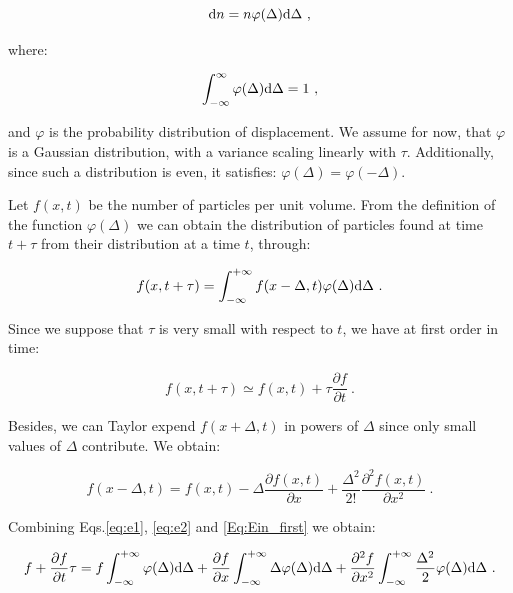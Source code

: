 \begin{equation}
	\textnormal{d}n = n\varphi(\Delta)\textnormal{d}\Delta ~,
\end{equation}

where:

\begin{equation}
	\int_{-\infty} ^{\infty} \varphi (\Delta)\textnormal{d} \Delta = 1 ~,
	\label{Eq:ein_def_phi}
\end{equation}

and $\varphi$ is the probability distribution of displacement. We assume for now, that  $\varphi$ is a Gaussian distribution, with a variance scaling linearly with $\tau$. Additionally, since such a distribution is even, it satisfies: $\varphi (\Delta) = \varphi (-\Delta)$.

Let $f(x,t)$ be the number of particles per unit volume. From the definition of the function $\varphi(\Delta)$ we can obtain the distribution of particles found at time $ t + \tau$ from their distribution at a time $t$, through:

\begin{equation}
	f(x, t+\tau) = \int_{-\infty} ^{ +\infty} f(x-\Delta, t) \varphi (\Delta) \textnormal{d}\Delta ~.
	\label{Eq:Ein_first}
\end{equation}

Since we suppose that $\tau$ is very small with respect to  $t$, we have at first order in time:

\begin{equation}
	f(x, t+\tau) \simeq f(x,t) + \tau \frac{\partial f}{\partial t} ~.
	\label{eq:e1}
\end{equation}

Besides, we can Taylor expend $f(x+\Delta, t)$ in powers of $\Delta$ since only small values of $\Delta$ contribute. We obtain:

\begin{equation}
	f(x - \Delta, t) = f(x,t) - \Delta \frac{\partial f(x,t)}{\partial x} + \frac{\Delta ^2}{2!} \frac{\partial ^2 f(x,t)}{\partial x^2} ~.
	\label{eq:e2}
\end{equation}

Combining Eqs.\ref{eq:e1}, \ref{eq:e2} and \ref{Eq:Ein_first} we obtain:

\begin{equation}
	f + \frac{\partial f}{\partial t} \tau = f \int_{-\infty}^{+\infty} \varphi(\Delta)\textnormal{d} \Delta + \frac{\partial f}{\partial x} \int_{-\infty}^{+\infty} \Delta \varphi (\Delta)\textnormal{d} \Delta + \frac{\partial ^2 f}{\partial x^2} \int_{-\infty}^{+\infty} \frac{\Delta ^2}{2} \varphi(\Delta)\textnormal{d}\Delta ~.
	\label{Eq:ein_expended}
\end{equation}

